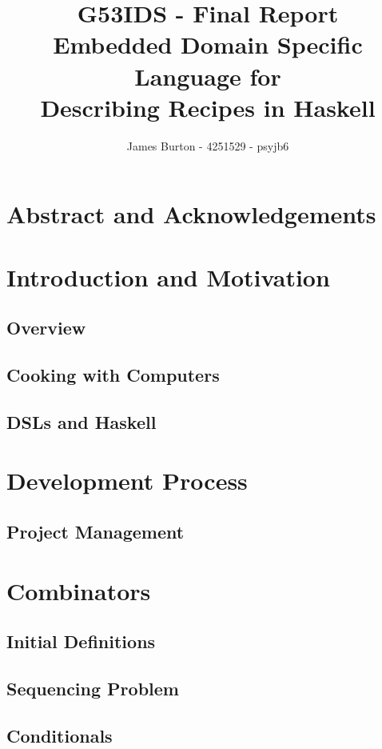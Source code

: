 \documentclass[11pt]{article}
\title
{ 
    \vspace{10em}
    G53IDS - Final Report \\
    \hfill \break
    \large Embedded Domain Specific Language for \\
    Describing Recipes in Haskell
}
\author{James Burton - 4251529 - psyjb6}
\begin{document}
    \maketitle
    \newpage

    \tableofcontents
    \newpage

    \section{Abstract and Acknowledgements}
    \newpage

    \section{Introduction and Motivation}
    \subsection{Overview}
    \subsection{Cooking with Computers}
    \subsection{DSLs and Haskell}

    \section{Development Process}
    \subsection{Project Management}
    
    \section{Combinators}
        \subsection{Initial Definitions}
        \subsection{Sequencing Problem}
        \subsection{Conditionals}
\end{document}
